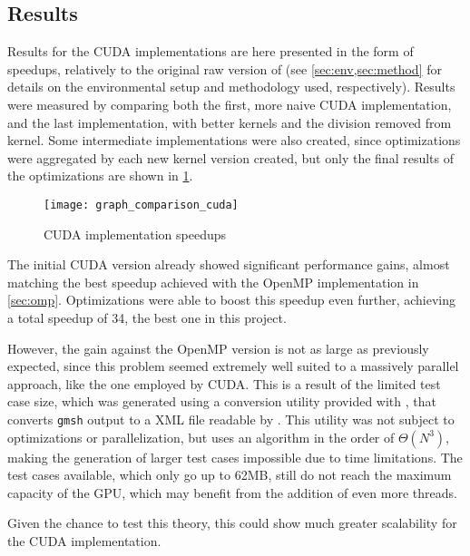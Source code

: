 \subsection{Results}
\label{subsec:cuda:results}


Results for the CUDA implementations are here presented in the form of speedups, relatively to the original raw version of \polu (see \cref{sec:env,sec:method} for details on the environmental setup and methodology used, respectively).
Results were measured by comparing both the first, more naive CUDA implementation, and the last implementation, with better kernels and the division removed from \update kernel.
Some intermediate implementations were also created, since optimizations were aggregated by each new kernel version created, but only the final results of the optimizations are shown in \cref{fig:cuda:results}.

\begin{figure}[!htp]
	\centering
	\texttt{[image: graph\_comparison\_cuda]}
	\caption{CUDA implementation speedups}
	\label{fig:cuda:results}
\end{figure}

The initial CUDA version already showed significant performance gains, almost matching the best speedup achieved with the OpenMP implementation in \cref{sec:omp}.
Optimizations were able to boost this speedup even further, achieving a total speedup of 34, the best one in this project.

However, the gain against the OpenMP version is not as large as previously expected, since this problem seemed extremely well suited to a massively parallel approach, like the one employed by CUDA.
This is a result of the limited test case size, which was generated using a conversion utility provided with \polu, that converts \texttt{gmsh} output to a XML file readable by \polu.
This utility was not subject to optimizations or parallelization, but uses an algorithm in the order of $\Theta(N^3)$, making the generation of larger test cases impossible due to time limitations.
The test cases available, which only go up to 62MB, still do not reach the maximum capacity of the GPU, which may benefit from the addition of even more threads.

Given the chance to test this theory, this could show much greater scalability for the CUDA implementation.
